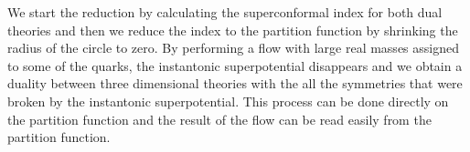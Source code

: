 We start the reduction by calculating the superconformal index for both dual theories and then we reduce the index to the partition function by shrinking the radius of the circle to zero.
By performing a flow with large real masses assigned to some of the quarks, the instantonic superpotential disappears and we obtain a duality between three dimensional theories with the all the symmetries that were broken by the instantonic superpotential.
This process can be done directly on the partition function and the result of the flow can be read easily from the partition function.\\

\begin{comment}
The key property of the index is that if we shrink the radius of the circle to 
zero it reduces to the partition function of the theory in three dimensions with a superpotential term due to the compactification.
At this point, we can perform the large mass flow we discussed previously in order to remove the superpotential. 
In this way we obtain the partition function of a three dimensional theory invariant under all the symmetries that were broken by the superpotential term.\\
If we perform this procedure for both theories we obtain the expression of the partition functions, which are equal because of the identity of the indices in four dimensions.
Moreover, the field content of the theory can be read easily from the expression of the partition function, since the symmetries are explicit and the superpotential can be read off from the constraints it imposes to the field charges.\\  
\end{comment}

